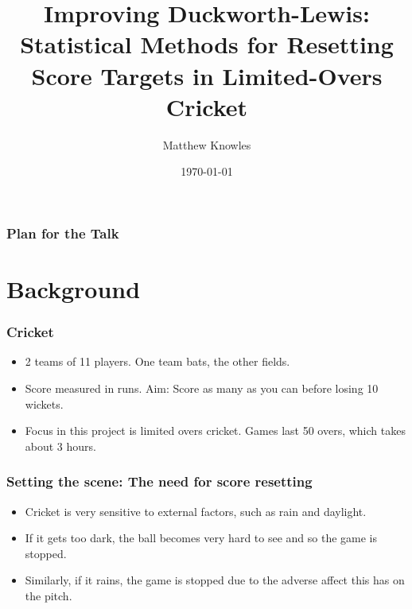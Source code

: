 \documentclass{beamer}
\title[Improving DLS]{Improving Duckworth-Lewis: Statistical Methods for Resetting Score Targets in Limited-Overs Cricket}
\author{Matthew Knowles}
\institute[UoY] 
{
University of York \\ 
\medskip
\textit{mk1320@york.ac.uk} 
}
\date{\today}
\begin{document}
\begin{frame}
\titlepage 
\end{frame}

\begin{frame}
\frametitle{Plan for the Talk} 
\tableofcontents 
\end{frame}

\section{Background}
\begin{frame}
\frametitle{Cricket}

\begin{itemize}
    \item 2 teams of 11 players. One team bats, the other fields. \\
    \pause
    \item Score measured in runs. Aim: Score as many as you can before losing 10 wickets. \\
    \pause
    \item Focus in this project is limited overs cricket. Games last 50 overs, which takes about 3 hours.
\end{itemize}

\end{frame}

\begin{frame}
\frametitle{Setting the scene: The need for score resetting}

\begin{itemize}
    \item Cricket is very sensitive to external factors, such as rain and daylight. \\
    \pause
    \item If it gets too dark, the ball becomes very hard to see and so the game is stopped. \\
    \pause
    \item Similarly, if it rains, the game is stopped due to the adverse affect this has on the pitch. \\
\end{itemize}
    
\end{frame}
\end{document}
